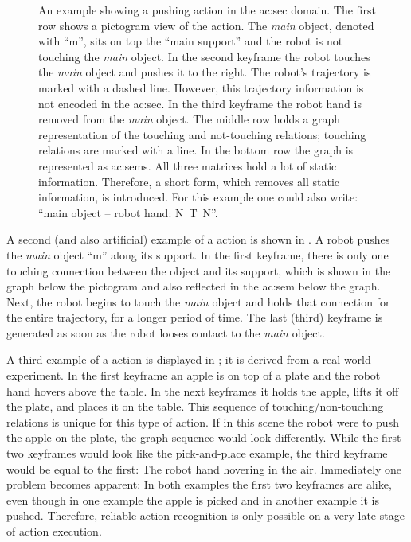 \begin{figure}
  \centering
  
  \caption{An example showing a pushing action in the \gls{ac:sec} domain. The first row shows a pictogram view of the action. The \emph{main} object, denoted with ``m'', sits on top the ``main support'' and the robot is not touching the \emph{main} object. In the second keyframe the robot touches the \emph{main} object and pushes it to the right. The robot's trajectory is marked with a dashed line. However, this trajectory information is not encoded in the \gls{ac:sec}. In the third keyframe the robot hand is removed from the \emph{main} object. The middle row holds a graph representation of the touching and not-touching relations; touching relations are marked with a line. In the bottom row the graph is represented as \glspl{ac:sem}. All three matrices hold a lot of static information. Therefore, a short form, which removes all static information, is introduced. For this example one could also write: ``main object -- robot hand: N~T~N''.}
  \label{fig:sec_examplescenario_pushing}
\end{figure}

A second (and also artificial) example of a  action is shown in .
A robot pushes the \emph{main} object ``m'' along its support.
In the first keyframe, there is only one touching connection between the object and its support, which is shown in the graph below the pictogram and also reflected in the \gls{ac:sem} below the graph.
Next, the robot begins to touch the \emph{main} object and holds that connection for the entire trajectory, \ie for a longer period of time.
The last (third) keyframe is generated as soon as the robot looses contact to the \emph{main} object.

A third example of a  action is displayed in ; it is derived from a real world experiment.
In the first keyframe an apple is on top of a plate and the robot hand hovers above the table.
In the next keyframes it holds the apple, lifts it off the plate, and places it on the table.
This sequence of touching/non-touching relations is unique for this type of action.
If in this scene the robot were to push the apple on the plate, the graph sequence would look differently.
While the first two keyframes would look like the pick-and-place example, the third keyframe would be equal to the first: The robot hand hovering in the air.
Immediately one problem becomes apparent: In both examples the first two keyframes are alike, even though in one example the apple is picked and in another example it is pushed.
Therefore, reliable action recognition is only possible on a very late stage of action execution.

